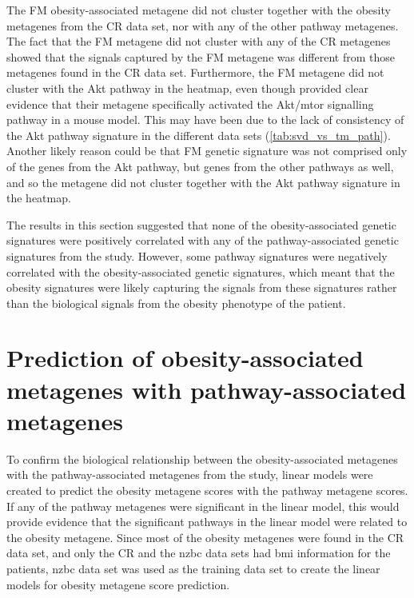 The FM obesity-associated metagene did not cluster together with the obesity metagenes from the CR data set, nor with any of the other pathway metagenes.
The fact that the FM metagene did not cluster with any of the CR metagenes showed that the signals captured by the FM metagene was different from those metagenes found in the CR data set.
Furthermore, the FM metagene did not cluster with the Akt pathway in the heatmap, even though \citet{Fuentes-Mattei2014} provided clear evidence that their metagene specifically activated the Akt/\gls{mtor} signalling pathway in a mouse model.
This may have been due to the lack of consistency of the Akt pathway signature in the different data sets (\cref{tab:svd_vs_tm_path}).
Another likely reason could be that FM genetic signature was not comprised only of the genes from the Akt pathway, but genes from the other pathways as well, and so the metagene did not cluster together with the Akt pathway signature in the heatmap.

The results in this section suggested that none of the obesity-associated genetic signatures were positively correlated with any of the pathway-associated genetic signatures from the \citet{Gatza2010a} study.
However, some pathway signatures were negatively correlated with the obesity-associated genetic signatures, which meant that the obesity signatures were likely capturing the signals from these signatures  rather than the biological signals from the obesity phenotype of the patient.

\vspace{-3mm}

\section{Prediction of obesity-associated metagenes with pathway-associated metagenes}
\label{sec:prediction_of_obesity_associated_metagene_with_pathway_associate_metagene}

To confirm the biological relationship between the obesity-associated metagenes with the pathway-associated metagenes from the \citet{Gatza2010a} study, linear models were created to predict the obesity metagene scores with the pathway metagene scores.
If any of the pathway metagenes were significant in the linear model, this would provide evidence that the significant pathways in the linear model were related to the obesity metagene.
Since most of the obesity metagenes were found in the CR data set, and only the CR and the \gls{nzbc} data sets had \gls{bmi} information for the patients, \gls{nzbc} data set was used as the training data set to create the linear models for obesity metagene score prediction.

